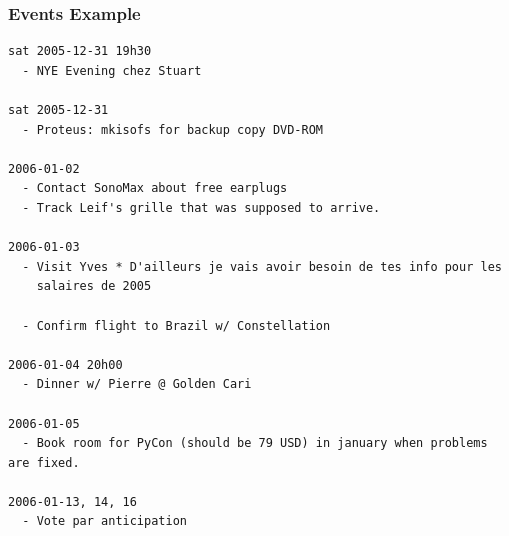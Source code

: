\documentclass[compress,trans]{beamer}
\begin{document}
% 
% 
% 
% 
% 
% 
% 
% 
% 
% 
% 
% 
% 
% 
% 
% 
% 
% 


























\begin{frame}[fragile]
  \frametitle{Events Example}

\begin{verbatim}
sat 2005-12-31 19h30
  - NYE Evening chez Stuart

sat 2005-12-31 
  - Proteus: mkisofs for backup copy DVD-ROM

2006-01-02
  - Contact SonoMax about free earplugs
  - Track Leif's grille that was supposed to arrive.

2006-01-03
  - Visit Yves * D'ailleurs je vais avoir besoin de tes info pour les
    salaires de 2005

  - Confirm flight to Brazil w/ Constellation

2006-01-04 20h00 
  - Dinner w/ Pierre @ Golden Cari

2006-01-05
  - Book room for PyCon (should be 79 USD) in january when problems are fixed.

2006-01-13, 14, 16
  - Vote par anticipation

\end{verbatim}

\end{frame}
\end{document}
